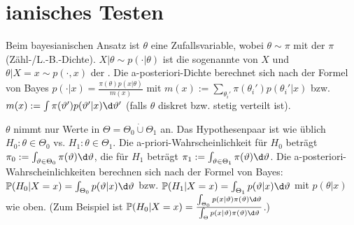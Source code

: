 \pagebreak

\section{%
    ianisches Testen%
}

\begin{Bem}
    Beim bayesianischen Ansatz ist $\theta$ eine Zufallsvariable,
    wobei $\theta \sim \pi$ mit der  $\pi$ (Zähl-/L.-B.-Dichte).
    $X|\theta \sim p(\cdot|\theta)$ ist die sogenannte  von $X$ und
    $\theta|X=x \sim p(\cdot,x)$ der .
    Die a-posteriori-Dichte berechnet sich nach der Formel von Bayes
    $p(\cdot|x) = \frac{\pi(\theta) p(x|\theta)}{m(x)}$ mit
    $m(x) := \sum_{\theta_i'} \pi(\theta_i') p(\theta_i'|x)$ bzw.
    $m(x) := \int \pi(\theta') p(\theta'|x) \d\theta'$
    (falls $\theta$ diskret bzw. stetig verteilt ist).

    $\theta$ nimmt nur Werte in $\Theta = \Theta_0 \mathbin{\dot{\cup}} \Theta_1$ an.
    Das Hypothesenpaar ist wie üblich $H_0\colon \theta \in \Theta_0$ vs.
    $H_1\colon \theta \in \Theta_1$.
    Die a-priori-Wahrscheinlichkeit für $H_0$ beträgt
    $\pi_0 := \int_{\theta \in \Theta_0} \pi(\theta)\d\theta$,
    die für $H_1$ beträgt $\pi_1 := \int_{\theta \in \Theta_1} \pi(\theta)\d\theta$.
    Die a-posteriori-Wahrscheinlichkeiten berechnen sich nach der Formel von Bayes:
    $\PP(H_0|X=x) = \int_{\Theta_0} p(\theta|x)\d\theta$ bzw.
    $\PP(H_1|X=x) = \int_{\Theta_1} p(\theta|x)\d\theta$
    mit $p(\theta|x)$ wie oben.
    (Zum Beispiel ist $\PP(H_0|X=x) = \frac{\int_{\Theta_0} p(x|\theta)\pi(\theta)\d\theta}
    {\int_\Theta p(x|\theta)\pi(\theta)\d\theta}$.)
\end{Bem}

\linie

